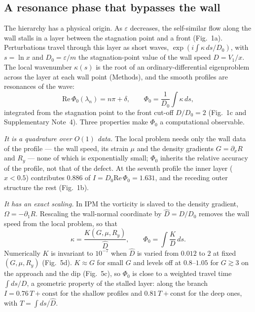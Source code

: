 \documentclass[11pt]{article}
\newcommand{\Dh}{\hat D}
\newcommand{\ReP}{\mathrm{Re}\,\Phi_0}
\begin{document}
\subsection*{A resonance phase that bypasses the wall}

The hierarchy has a physical origin. As $\varepsilon$ decreases, the self-similar flow along the wall stalls in a
layer between the stagnation point and a front (Fig.~1a). Perturbations travel through this layer as short waves,
$\exp(i\int\kappa\,ds/D_0)$, with $s=\ln x$ and $D_0=\varepsilon/m$ the stagnation-point value of the wall speed
$D=V_1/x$. The local wavenumber $\kappa(s)$ is the root of an ordinary-differential eigenproblem across the layer at
each wall point (Methods), and the smooth profiles are resonances of the wave:
\begin{equation}
\ReP(\lambda_n)=n\pi+\delta ,\qquad \Phi_0=\frac{1}{D_0}\int\kappa\,ds ,
\label{eq:res}
\end{equation}
integrated from the stagnation point to the front cut-off $D/D_0=2$ (Fig.~1c and Supplementary Note~4). Three
properties make $\Phi_0$ a computational observable.

\emph{It is a quadrature over $O(1)$ data.} The local problem needs only the wall data of the profile --- the wall
speed, its strain $\mu$ and the density gradients $G=\partial_xR$ and $R_y$ --- none of which is exponentially small;
$\Phi_0$ inherits the relative accuracy of the profile, not that of the defect. At the seventh profile the inner layer
($x<0.5$) contributes $0.886$ of $I=D_0\ReP=1.631$, and the receding outer structure the rest (Fig.~1b).

\emph{It has an exact scaling.} In IPM the vorticity is slaved to the density gradient, $\Omega=-\partial_1R$.
Rescaling the wall-normal coordinate by $\Dh=D/D_0$ removes the wall speed from the local problem, so that
\begin{equation}
\kappa=\frac{K(G,\mu,R_y)}{\Dh},\qquad \Phi_0=\int\frac{K}{D}\,ds .
\label{eq:scaling}
\end{equation}
Numerically $K$ is invariant to $10^{-7}$ when $\Dh$ is varied from $0.012$ to $2$ at fixed $(G,\mu,R_y)$
(Fig.~5d). $K\approx G$ for small $G$ and levels off at $0.8$--$1.05$ for $G\gtrsim3$ on the approach and the dip
(Fig.~5c), so $\Phi_0$ is close to a weighted travel time $\int ds/D$, a geometric property of the stalled layer:
along the branch $I=0.76\,T+\text{const}$ for the shallow profiles and $0.81\,T+\text{const}$ for the deep ones, with
$T=\int ds/\Dh$.
\end{document}
